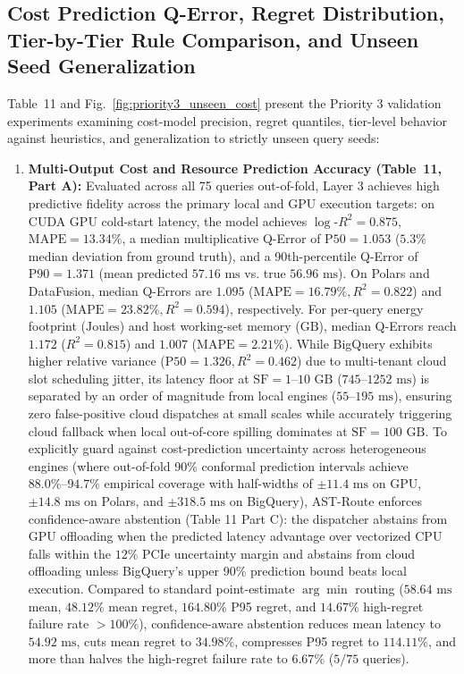 \documentclass[10pt,a4paper]{article}
\begin{document}
\subsection{Cost Prediction Q-Error, Regret Distribution, Tier-by-Tier Rule Comparison, and Unseen Seed Generalization}
Table~11 and Fig.~\ref{fig:priority3_unseen_cost} present the Priority 3 validation experiments examining cost-model precision, regret quantiles, tier-level behavior against heuristics, and generalization to strictly unseen query seeds:
\begin{enumerate}[leftmargin=1.5em,itemsep=2pt]
    \item \textbf{Multi-Output Cost and Resource Prediction Accuracy (Table~11, Part A):} Evaluated across all 75 queries out-of-fold, Layer 3 achieves high predictive fidelity across the primary local and GPU execution targets: on CUDA GPU cold-start latency, the model achieves $\log\text{-}R^2 = \mathbf{0.875}$, $\text{MAPE} = \mathbf{13.34\%}$, a median multiplicative Q-Error of $\text{P50} = \mathbf{1.053}$ ($5.3\%$ median deviation from ground truth), and a 90th-percentile Q-Error of $\text{P90} = \mathbf{1.371}$ (mean predicted $57.16\text{ ms}$ vs. true $56.96\text{ ms}$). On Polars and DataFusion, median Q-Errors are $\mathbf{1.095}$ ($\text{MAPE}=16.79\%, R^2=0.822$) and $\mathbf{1.105}$ ($\text{MAPE}=23.82\%, R^2=0.594$), respectively. For per-query energy footprint ($\text{Joules}$) and host working-set memory ($\text{GB}$), median Q-Errors reach $\mathbf{1.172}$ ($R^2=0.815$) and $\mathbf{1.007}$ ($\text{MAPE}=2.21\%$). While BigQuery exhibits higher relative variance ($\text{P50}=1.326, R^2=0.462$) due to multi-tenant cloud slot scheduling jitter, its latency floor at $\text{SF}=1\text{--}10\text{ GB}$ ($745\text{--}1252\text{ ms}$) is separated by an order of magnitude from local engines ($55\text{--}195\text{ ms}$), ensuring zero false-positive cloud dispatches at small scales while accurately triggering cloud fallback when local out-of-core spilling dominates at $\text{SF}=100\text{ GB}$. To explicitly guard against cost-prediction uncertainty across heterogeneous engines (where out-of-fold 90\% conformal prediction intervals achieve $88.0\%\text{--}94.7\%$ empirical coverage with half-widths of $\pm 11.4\text{ ms}$ on GPU, $\pm 14.8\text{ ms}$ on Polars, and $\pm 318.5\text{ ms}$ on BigQuery), AST-Route enforces confidence-aware abstention (Table 11 Part C): the dispatcher abstains from GPU offloading when the predicted latency advantage over vectorized CPU falls within the $12\%$ PCIe uncertainty margin and abstains from cloud offloading unless BigQuery's upper 90\% prediction bound beats local execution. Compared to standard point-estimate $\arg\min$ routing ($58.64\text{ ms}$ mean, $48.12\%$ mean regret, $164.80\%$ P95 regret, and $14.67\%$ high-regret failure rate $>100\%$), confidence-aware abstention reduces mean latency to $54.92\text{ ms}$, cuts mean regret to $34.98\%$, compresses P95 regret to $114.11\%$, and more than halves the high-regret failure rate to $6.67\%$ ($5/75$ queries).

\end{enumerate}
\end{document}
